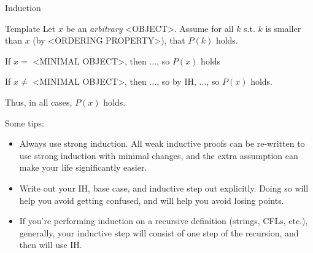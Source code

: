\documentclass{beamer}
\begin{document}
\begin{frame}[t]{Induction}
    \begin{exampleblock}{Template}
    Let $x$ be an \textit{arbitrary} <OBJECT>. Assume for all $k$ s.t. $k$ is smaller than $x$ (by <ORDERING PROPERTY>), that $P(k)$ holds.

    \vspace{.5cm}
    
    If $x =$ <MINIMAL OBJECT>, then $\dotsc$, so $P(x)$ holds

    \vspace{.5cm}

    If $x \neq$ <MINIMAL OBJECT>, then $\dotsc$, so by IH, $\dotsc$, so $P(x)$ holds.

    \vspace{.5cm}

    Thus, in all cases, $P(x)$ holds.
    \end{exampleblock}
    \vspace{.7 cm}
    \pause Some tips:
    \begin{itemize}
        \item \alert{Always use strong induction}. All weak inductive proofs can be re-written to use strong induction with minimal changes, and the extra assumption can make your life significantly easier.
        \item \alert{Write out your IH, base case, and inductive step out explicitly.} Doing so will help you avoid getting confused, and will help you avoid losing points.
        \item If you're performing induction on a recursive definition (strings, CFLs, etc.), generally, your inductive step will consist of one step of the recursion, and then will use IH.
    \end{itemize}
\end{frame}
\end{document}
